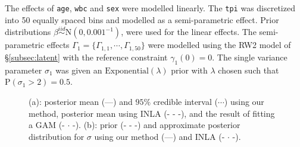 \documentclass[AMA,STIX1COL,doublespace]{WileyNJD-v2}
\begin{document}
The effects of \texttt{age}, \texttt{wbc} and \texttt{sex} were modelled linearly. The \texttt{tpi} was discretized into 50 equally spaced bins and modelled as a semi-parametric effect. Prior distributions $\beta \stackrel{iid}{\sim} \text{N}(0, 0.001^{-1})$, were used for the linear effects. The semi-parametric effects $\Gamma_1 = \{\Gamma_{1,1}, \cdots, \Gamma_{1,50}\}$ were modelled using the RW2 model of \S\ref{subsec:latent} with the reference constraint $\gamma_{1}(0) = 0$. The single variance parameter $\sigma_{1}$ was given an $\text{Exponential}(\lambda)$ prior with $\lambda$ chosen such that $\text{P}(\sigma_{1} > 2) = 0.5$. 

\begin{figure}[ht]
\centering
{}
\caption{(a): posterior mean (---) and $95\%$ credible interval ($\cdots$) using our method, posterior mean using INLA (- - -), and the result of fitting a GAM (- $\cdot$ -). (b): prior (- - -) and approximate posterior distribution for $\sigma$ using our method (---) and INLA (- $\cdot$ -).}
\label{fig:leuk}
\end{figure}
\end{document}
